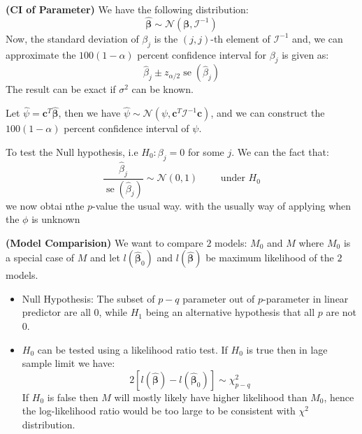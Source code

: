 \begin{remark}{\textbf{(CI of Parameter)}}
    We have the following distribution:
    \begin{equation*}
        \hat{\boldsymbol \beta} \sim \mathcal{N}(\boldsymbol \beta, \mathcal{I}^{-1})
    \end{equation*}
    Now, the standard deviation of $\beta_j$ is the $(j,j)$-th element of $\mathcal{I}^{-1}$ and, we can approximate the $100(1-\alpha)$ percent confidence interval for $\beta_j$ is given as:
    \begin{equation*}
        \hat{\beta}_j \pm z_{\alpha/2}\operatorname{se}(\hat{\beta}_j)
    \end{equation*}
    The result can be exact if $\sigma^2$ can be known. 
\end{remark}

\begin{remark}
    Let $\hat{\psi} = \boldsymbol c^T\hat{\boldsymbol \beta}$, then we have $\hat{\psi} \sim \mathcal{N}(\psi, \boldsymbol c^T\mathcal{I}^{-1}\boldsymbol c)$, and we can construct the $100(1-\alpha)$ percent confidence interval of $\psi$. 
\end{remark}

\begin{remark}
    To test the Null hypothesis, i.e $H_0 : \beta_j = 0$ for some $j$. We can the fact that:
    \begin{equation*}
        \frac{\hat{\beta}_j}{\operatorname{se}(\hat{\beta}_j)} \sim \mathcal{N}(0, 1) \qquad \text{ under } H_0
    \end{equation*}
    we now obtai nthe $p$-value the usual way. with the usually way of applying when the $\phi$ is unknown
\end{remark}

\begin{remark}{\textbf{(Model Comparision)}}
    We want to compare $2$ models: $M_0$ and $M$ where $M_0$ is a special case of $M$ and let $l(\hat{\boldsymbol \beta}_0)$ and $l(\hat{\boldsymbol \beta})$ be maximum likelihood of the $2$ models. 
    \begin{itemize}
        \item Null Hypothesis: The subset of $p-q$ parameter out of $p$-parameter in linear predictor are all $0$, while $H_1$ being an alternative hypothesis that all $p$ are not $0$. 
        \item $H_0$ can be tested using a likelihood ratio test. If $H_0$ is true then in lage sample limit we have:
        \begin{equation*}
            2[l(\hat{\boldsymbol \beta}) - l(\hat{\boldsymbol \beta}_0)] \sim \chi^2_{p-q}
        \end{equation*}
        If $H_0$ is false then $M$ will mostly likely have higher likelihood than $M_0$, hence the log-likelihood ratio would be too large to be consistent with $\chi^2$ distribution.
    \end{itemize}
\end{remark}

